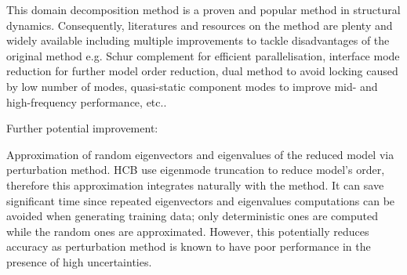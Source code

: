 \documentclass[a4paper,oneside,10pt]{article}
\begin{document}
\begin{singlespace}
This domain decomposition method is a proven and popular method in structural dynamics.
Consequently, literatures and resources on the method are plenty and widely available including multiple improvements to tackle disadvantages of the original method e.g. Schur complement for efficient parallelisation, interface mode reduction for further model order reduction, dual method to avoid locking caused by low number of modes, quasi-static component modes to improve mid- and high-frequency performance, etc..
\vspace{10pt} 

Further potential improvement: 
\vspace{10pt} 

Approximation of random eigenvectors and eigenvalues of the reduced model via perturbation method. 
HCB use eigenmode truncation to reduce model's order, therefore this approximation integrates naturally with the method. 
It can save significant time since repeated eigenvectors and eigenvalues computations can be avoided when generating training data; only deterministic ones are computed while the random ones are approximated. 
However, this potentially reduces accuracy as perturbation method is known to have poor performance in the presence of high uncertainties. 
\end{singlespace}



\newpage
 
% 
% 
% 
%
%
%
% 

%

\newpage 
\printbibliography
\end{document}
